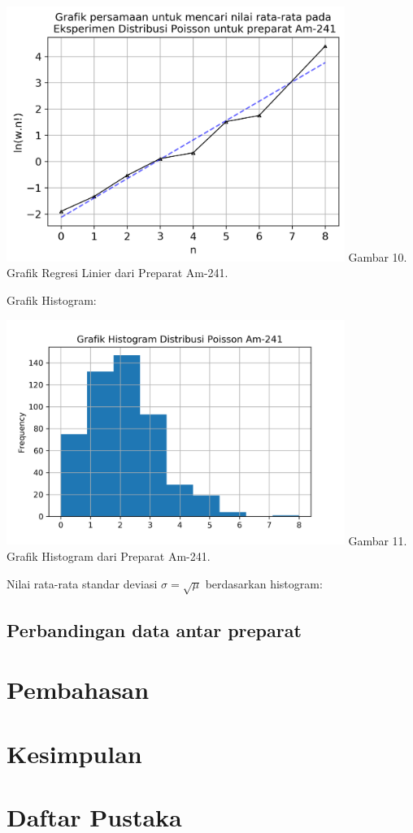 \documentclass{article}
\begin{document}
			\begin{center}
				\includegraphics[width=110mm]{Data/Am-241-Graph.png}
				Gambar 10. Grafik Regresi Linier dari Preparat Am-241.
			\end{center}
			Grafik Histogram:
			\begin{center}
				\includegraphics[width=110mm]{Data/Am-241.png}
				Gambar 11. Grafik Histogram dari Preparat Am-241.
			\end{center}
			Nilai rata-rata standar deviasi $\sigma = \sqrt{\mu}$ berdasarkan histogram:\\
			
			\subsection*{Perbandingan data antar preparat}
			
	
	\section*{Pembahasan}
	
	\section*{Kesimpulan}
	
	\section*{Daftar Pustaka}
	
	
\end{document}
